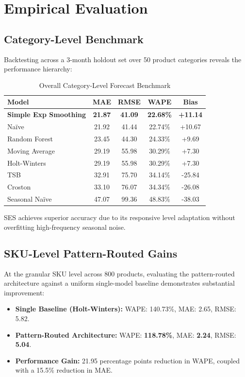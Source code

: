 \documentclass[conference]{IEEEtran}
\begin{document}
\section{Empirical Evaluation}

\subsection{Category-Level Benchmark}
Backtesting across a 3-month holdout set over 50 product categories reveals the performance hierarchy:

\begin{table}[htbp]
\caption{Overall Category-Level Forecast Benchmark}
\begin{center}
\begin{tabular}{lcccc}
\toprule
\textbf{Model} & \textbf{MAE} & \textbf{RMSE} & \textbf{WAPE} & \textbf{Bias} \\
\midrule
\textbf{Simple Exp Smoothing} & \textbf{21.87} & \textbf{41.09} & \textbf{22.68\%} & \textbf{+11.14} \\
Naïve & 21.92 & 41.44 & 22.74\% & +10.67 \\
Random Forest & 23.45 & 44.30 & 24.33\% & +9.69 \\
Moving Average & 29.19 & 55.98 & 30.29\% & +7.30 \\
Holt-Winters & 29.19 & 55.98 & 30.29\% & +7.30 \\
TSB & 32.91 & 75.70 & 34.14\% & -25.84 \\
Croston & 33.10 & 76.07 & 34.34\% & -26.08 \\
Seasonal Naïve & 47.07 & 99.36 & 48.83\% & -38.03 \\
\bottomrule
\end{tabular}
\end{center}
\end{table}

SES achieves superior accuracy due to its responsive level adaptation without overfitting high-frequency seasonal noise.

\subsection{SKU-Level Pattern-Routed Gains}
At the granular SKU level across 800 products, evaluating the pattern-routed architecture against a uniform single-model baseline demonstrates substantial improvement:
\begin{itemize}
    \item \textbf{Single Baseline (Holt-Winters):} WAPE: 140.73\%, MAE: 2.65, RMSE: 5.82.
    \item \textbf{Pattern-Routed Architecture:} WAPE: \textbf{118.78\%}, MAE: \textbf{2.24}, RMSE: \textbf{5.04}.
    \item \textbf{Performance Gain:} 21.95 percentage points reduction in WAPE, coupled with a 15.5\% reduction in MAE.
\end{itemize}
\end{document}

